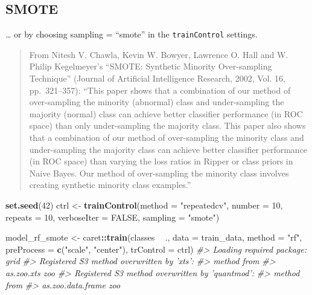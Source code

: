 \documentclass[]{book}
\newenvironment{Shaded}{\begin{snugshade}}{\end{snugshade}}
\newcommand{\CommentTok}[1]{\textcolor[rgb]{0.56,0.35,0.01}{\textit{#1}}}
\newcommand{\DataTypeTok}[1]{\textcolor[rgb]{0.13,0.29,0.53}{#1}}
\newcommand{\DecValTok}[1]{\textcolor[rgb]{0.00,0.00,0.81}{#1}}
\newcommand{\KeywordTok}[1]{\textcolor[rgb]{0.13,0.29,0.53}{\textbf{#1}}}
\newcommand{\NormalTok}[1]{#1}
\newcommand{\OperatorTok}[1]{\textcolor[rgb]{0.81,0.36,0.00}{\textbf{#1}}}
\newcommand{\OtherTok}[1]{\textcolor[rgb]{0.56,0.35,0.01}{#1}}
\newcommand{\StringTok}[1]{\textcolor[rgb]{0.31,0.60,0.02}{#1}}
\begin{document}
\hypertarget{smote}{%
\subsection{SMOTE}\label{smote}}

\ldots{} or by choosing sampling = ``smote'' in the \texttt{trainControl} settings.

\begin{quote}
From Nitesh V. Chawla, Kevin W. Bowyer, Lawrence O. Hall and W. Philip Kegelmeyer's ``SMOTE: Synthetic Minority Over-sampling Technique'' (Journal of Artificial Intelligence Research, 2002, Vol. 16, pp.~321--357): ``This paper shows that a combination of our method of over-sampling the minority (abnormal) class and under-sampling the majority (normal) class can achieve better classifier performance (in ROC space) than only under-sampling the majority class. This paper also shows that a combination of our method of over-sampling the minority class and under-sampling the majority class can achieve better classifier performance (in ROC space) than varying the loss ratios in Ripper or class priors in Naive Bayes. Our method of over-sampling the minority class involves creating synthetic minority class examples.''
\end{quote}

\begin{Shaded}
\begin{Highlighting}[]
\KeywordTok{set.seed}\NormalTok{(}\DecValTok{42}\NormalTok{)}
\NormalTok{ctrl <-}\StringTok{ }\KeywordTok{trainControl}\NormalTok{(}\DataTypeTok{method =} \StringTok{"repeatedcv"}\NormalTok{, }
                     \DataTypeTok{number =} \DecValTok{10}\NormalTok{, }
                     \DataTypeTok{repeats =} \DecValTok{10}\NormalTok{, }
                     \DataTypeTok{verboseIter =} \OtherTok{FALSE}\NormalTok{,}
                     \DataTypeTok{sampling =} \StringTok{"smote"}\NormalTok{)}

\NormalTok{model_rf_smote <-}\StringTok{ }\NormalTok{caret}\OperatorTok{::}\KeywordTok{train}\NormalTok{(classes }\OperatorTok{~}\StringTok{ }\NormalTok{.,}
                              \DataTypeTok{data =}\NormalTok{ train_data,}
                              \DataTypeTok{method =} \StringTok{"rf"}\NormalTok{,}
                              \DataTypeTok{preProcess =} \KeywordTok{c}\NormalTok{(}\StringTok{"scale"}\NormalTok{, }\StringTok{"center"}\NormalTok{),}
                              \DataTypeTok{trControl =}\NormalTok{ ctrl)}
\CommentTok{#> Loading required package: grid}
\CommentTok{#> Registered S3 method overwritten by 'xts':}
\CommentTok{#>   method     from}
\CommentTok{#>   as.zoo.xts zoo}
\CommentTok{#> Registered S3 method overwritten by 'quantmod':}
\CommentTok{#>   method            from}
\CommentTok{#>   as.zoo.data.frame zoo}
\end{Highlighting}
\end{Shaded}
\end{document}
